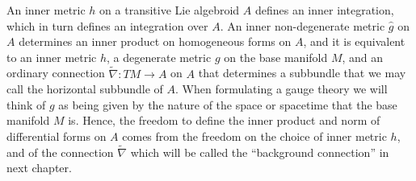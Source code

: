 An inner metric $h$ on a transitive Lie algebroid $A$ defines an inner integration, which in turn defines an integration over $A$. An inner non-degenerate metric $\hat g$ on $A$ determines an inner product on homogeneous forms on $A$, and it is equivalent to an inner metric $h$, a degenerate metric $g$ on the base manifold $M$, and an ordinary connection $\tilde \nabla: TM \to A$ on $A$ that determines a subbundle that we may call the horizontal subbundle of $A$. When formulating a gauge theory we will think of $g$ as being given by the nature of the space or spacetime that the base manifold $M$ is. Hence, the freedom to define the inner product and norm of differential forms on $A$ comes from the freedom on the choice of inner metric $h$, and of the connection $\tilde \nabla$ which will be called the ``background connection'' in next chapter.

